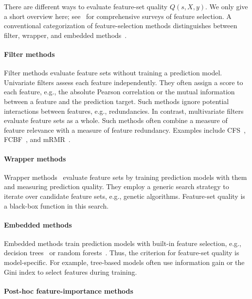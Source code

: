 \documentclass{article}
\theoremstyle{definition}
\begin{document}
There are different ways to evaluate feature-set quality $Q(s,X,y)$.
We only give a short overview here; see~\cite{chandrashekar2014survey,li2017feature} for comprehensive surveys of feature selection.
A conventional categorization of feature-selection methods distinguishes between filter, wrapper, and embedded methods~\cite{guyon2003introduction}.

\paragraph{Filter methods}

Filter methods evaluate feature sets without training a prediction model.
Univariate filters assess each feature independently.
They often assign a score to each feature, e.g., the absolute Pearson correlation or the mutual information between a feature and the prediction target.
Such methods ignore potential interactions between features, e.g., redundancies.
In contrast, multivariate filters evaluate feature sets as a whole.
Such methods often combine a measure of feature relevance with a measure of feature redundancy.
Examples include CFS~\cite{hall1999correlation, hall2000correlation}, FCBF~\cite{yu2003feature}, and mRMR~\cite{peng2005feature}.

\paragraph{Wrapper methods}

Wrapper methods~\cite{kohavi1997wrappers} evaluate feature sets by training prediction models with them and measuring prediction quality.
They employ a generic search strategy to iterate over candidate feature sets, e.g., genetic algorithms.
Feature-set quality is a black-box function in this search.

\paragraph{Embedded methods}

Embedded methods train prediction models with built-in feature selection, e.g., decision trees~\cite{breiman1984classification} or random forests~\cite{breiman2001random}.
Thus, the criterion for feature-set quality is model-specific.
For example, tree-based models often use information gain or the Gini index to select features during training.

\paragraph{Post-hoc feature-importance methods}
\end{document}
